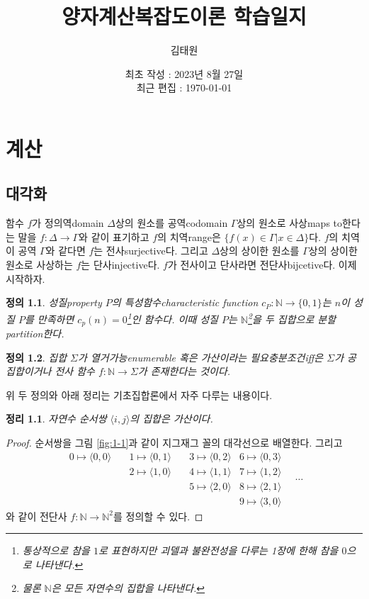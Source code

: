\documentclass[a4paper,chapter,atbegshi]{oblivoir}
\title{양자계산복잡도이론 학습일지}
\author{김태원}
\date{최초 작성 : 2023년 8월 27일 \\ 최근 편집 : \today}
\newtheorem{defn}{정의}[chapter]
\newtheorem{theo}{정리}[chapter]
\begin{document}
\maketitle
\break
\tableofcontents
\chapter{계산}
\section{대각화}
함수 $f$가 정의역{\tiny domain} $\Delta$상의 원소를 공역{\tiny codomain} 
$\Gamma$상의 원소로 사상{\tiny maps to}한다는 말을 $f:\Delta\rightarrow\Gamma$와
같이 표기하고 $f$의 치역{\tiny range}은 $\{f(x)\in\Gamma|x\in\Delta\}$다.
$f$의 치역이 공역 $\Gamma$와 같다면 $f$는 전사{\tiny surjective}다.
그리고 $\Delta$상의 상이한 원소를 $\Gamma$상의 상이한 원소로 사상하는 $f$는
단사{\tiny injective}다. $f$가 전사이고 단사라면 전단사{\tiny bijcetive}다.
이제 시작하자.
\begin{defn}\label{defn:1-1}
성질{\tiny property} $P$의 \emph{특성함수\tiny characteristic function}
$c_P:\mathbb{N}\rightarrow\{0,1\}$는 $n$이 성질 $P$를 만족하면 
$c_p(n)=0$\footnote{통상적으로 참을 $1$로 표현하지만 괴델과 불완전성을 다루는
1장에 한해 참을 $0$으로 나타낸다.}인 함수다. 이때 성질 $P$는 
$\mathbb{N}$\footnote{물론 $\mathbb{N}$은 모든 자연수의 집합을 나타낸다.}을
두 집합으로 분할{\tiny partition}한다.
\end{defn}
\begin{defn}\label{defn:1-2}
집합 $\Sigma$가 \emph{열거가능\tiny enumerable} 혹은 \emph{가산}이라는
필요충분조건{\tiny iff}은 $\Sigma$가 공집합이거나 전사 함수 $f:\mathbb{N}
\rightarrow\Sigma$가 존재한다는 것이다. 
\end{defn}
위 두 정의와 아래 정리는 기초집합론에서 자주 다루는 내용이다.
\begin{theo}\label{theo:1-1}
  자연수 순서쌍 $\langle i,j\rangle$의 집합은 가산이다.
\end{theo}
\begin{proof}
  순서쌍을 그림 \ref{fig:1-1}과 같이 지그재그 꼴의 대각선으로 배열한다.
  그리고
  \[
  \begin{matrix}
     0\mapsto\langle0,0\rangle\quad
     &1\mapsto\langle0,1\rangle\quad
     &3\mapsto\langle0,2\rangle
     &6\mapsto\langle0,3\rangle\\
     &2\mapsto\langle1,0\rangle\quad
     &4\mapsto\langle1,1\rangle
     &7\mapsto\langle1,2\rangle\\
     &&5\mapsto\langle2,0\rangle
     &8\mapsto\langle 2,1\rangle\\
     &&&9\mapsto\langle3,0\rangle
  \end{matrix}
  \quad\cdots
  \]
  와 같이 전단사 $f:\mathbb{N}\rightarrow\mathbb{N}^2$를 정의할 수 있다.
\end{proof}
\end{document}
